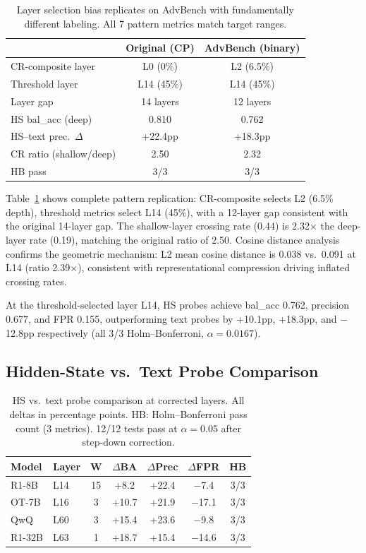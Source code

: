 \documentclass[11pt]{article}
\begin{document}
\begin{table}[t]
\centering
\small
\begin{tabular}{@{}lcc@{}}
\toprule
& \textbf{Original (CP)} & \textbf{AdvBench (binary)} \\
\midrule
CR-composite layer & L0 (0\%) & L2 (6.5\%) \\
Threshold layer & L14 (45\%) & L14 (45\%) \\
Layer gap & 14 layers & 12 layers \\
HS bal\_acc (deep) & 0.810 & 0.762 \\
HS--text prec.\ $\Delta$ & +22.4pp & +18.3pp \\
CR ratio (shallow/deep) & 2.50 & 2.32 \\
HB pass & 3/3 & 3/3 \\
\bottomrule
\end{tabular}
\caption{Layer selection bias replicates on AdvBench with fundamentally different labeling. All 7 pattern metrics match target ranges.}
\label{tab:advbench-pattern}
\end{table}

Table~\ref{tab:advbench-pattern} shows complete pattern replication: CR-composite selects L2 (6.5\% depth), threshold metrics select L14 (45\%), with a 12-layer gap consistent with the original 14-layer gap.
The shallow-layer crossing rate (0.44) is 2.32$\times$ the deep-layer rate (0.19), matching the original ratio of 2.50.
Cosine distance analysis confirms the geometric mechanism: L2 mean cosine distance is 0.038 vs.\ 0.091 at L14 (ratio 2.39$\times$), consistent with representational compression driving inflated crossing rates.

At the threshold-selected layer L14, HS probes achieve bal\_acc 0.762, precision 0.677, and FPR 0.155, outperforming text probes by +10.1pp, +18.3pp, and $-$12.8pp respectively (all 3/3 Holm--Bonferroni, $\alpha{=}0.0167$).

\subsection{Hidden-State vs.\ Text Probe Comparison}
\label{sec:hs-text}

\begin{table}[t]
\centering
\small
\begin{tabular}{@{}llccccc@{}}
\toprule
\textbf{Model} & \textbf{Layer} & \textbf{W} & $\Delta$\textbf{BA} & $\Delta$\textbf{Prec} & $\Delta$\textbf{FPR} & \textbf{HB} \\
\midrule
R1-8B & L14 & 15 & +8.2 & +22.4 & $-$7.4 & 3/3 \\
OT-7B & L16 & 3 & +10.7 & +21.9 & $-$17.1 & 3/3 \\
QwQ & L60 & 3 & +15.4 & +23.6 & $-$9.8 & 3/3 \\
R1-32B & L63 & 1 & +18.7 & +15.4 & $-$14.6 & 3/3 \\
\bottomrule
\end{tabular}
\caption{HS vs.\ text probe comparison at corrected layers. All deltas in percentage points. HB: Holm--Bonferroni pass count (3 metrics). 12/12 tests pass at $\alpha{=}0.05$ after step-down correction.}
\label{tab:hb-summary}
\end{table}
\end{document}
